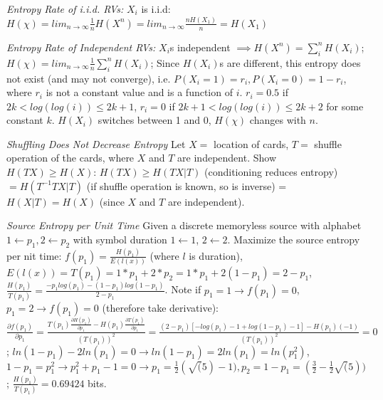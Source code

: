 \documentclass[10pt]{article}
\begin{document}
\begin{tiny}
\begin{multicols}{3}
\textit{Entropy Rate of i.i.d. RVs:} $X_i$ is i.i.d: $H(\chi) = lim_{n \to \infty} \frac{1}{n} H(X^n) = lim_{n \to \infty} \frac{nH(X_1)}{n} = H(X_1)$

\textit{Entropy Rate of Independent RVs:} $X_i$s independent $\implies H(X^n) = \sum_i^n H(X_i)$; $H(\chi) = lim_{n \to \infty} \frac{1}{n} \sum_i^n H(X_i) $; Since $H(X_i)$s are different, this entropy does not exist (and may not converge), i.e. $P(X_i = 1) = r_i, P(X_i = 0) = 1 - r_i$, where $r_i$ is not a constant value and is a function of $i$. $r_i = 0.5$ if $2k < log(log(i)) \leq 2k + 1$, $r_i = 0$ if $2k + 1 < log(log(i)) \leq 2k +2 $ for some constant $k$. $H(X_i)$ switches between 1 and 0, $H(\chi)$ changes with $n$.

\textit{Shuffling Does Not Decrease Entropy} Let $X =$ location of cards, $T =$ shuffle operation of the cards, where $X$ and $T$ are independent. Show $H(TX) \geq H(X)$: $H(TX) \geq H(TX|T)$ (conditioning reduces entropy) $= H(T^{-1}TX|T)$ (if shuffle operation is known, so is inverse) = $H(X|T) = H(X)$ (since $X$ and $T$ are independent).

\textit{Source Entropy per Unit Time} Given a discrete memoryless source with alphabet $1 \gets p_1, 2 \gets p_2$ with symbol duration $1 \gets 1$, $2 \gets 2$. Maximize the source entropy per nit time: $f(p_1) = \frac{H(p_1)}{E(l(x))}$ (where $l$ is duration), $E(l(x)) = T(p_1) = 1*p_1 + 2*p_2 = 1*p_1 + 2(1-p_1) = 2 - p_1$, $\frac{H(p_1)}{T(p_1)} = \frac{-p_1 log(p_1) - (1-p_1)log(1-p_1)}{2-p_1}$. Note if $p_1 = 1 \to f(p_1) = 0$, $p_1 = 2 \to f(p_1) = 0$ (therefore take derivative): $\frac{\partial f(p_1)}{\partial p_1} = \frac{ T(p_1)\frac{\partial H(p_1)}{\partial p_1} - H(p_1)\frac{\partial T(p_1)}{\partial p_1}}{(T(p_1))^2} = \frac{(2-p_1)[-log(p_1) -1 + log(1-p_1) - 1] - H(p_1)(-1)}{(T(p_1))^2}=0$; $ln(1-p_1) - 2ln(p_1) = 0 \to ln(1-p_1) = 2ln(p_1) = ln(p_1^2)$, $1-p_1 = p_1^2 \to p_1^2 + p_1 - 1 = 0 \to p_1 = \frac{1}{2}(\sqrt(5) - 1), p_2 = 1 - p_1 = (\frac{3}{2} - \frac{1}{2}\sqrt(5))$; $\frac{H(p_1)}{T(p_1)} = 0.69424$ bits. 


\end{multicols}
\end{tiny}
\end{document}

